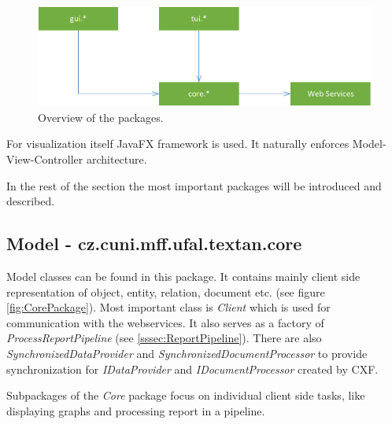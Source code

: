 \begin{figure}[!htb]
        \centering
        \includegraphics[width=\textwidth]{Images/ClientOverview}
        \caption{Overview of the packages.}
        \label{fig:ClientOverview}
\end{figure}

For visualization itself JavaFX framework is used. It naturally enforces
Model-View-Controller architecture.

In the rest of the section the most important packages will be introduced and
described.

\subsection{Model - cz.cuni.mff.ufal.textan.core}

Model classes can be found in this package. It contains mainly client side
representation of object, entity, relation, document etc. (see figure \ref{fig:CorePackage}). Most important class
is \emph{Client} which is used for communication with the webservices. It also
serves as a factory of \emph{ProcessReportPipeline} (see
\ref{sssec:ReportPipeline}). There are also \emph{SynchronizedDataProvider} and
\emph{SynchronizedDocumentProcessor} to provide synchronization for
\emph{IDataProvider} and \emph{IDocumentProcessor} created by CXF.

Subpackages of the \emph{Core} package focus on individual client side tasks,
like displaying graphs and processing report in a pipeline.

